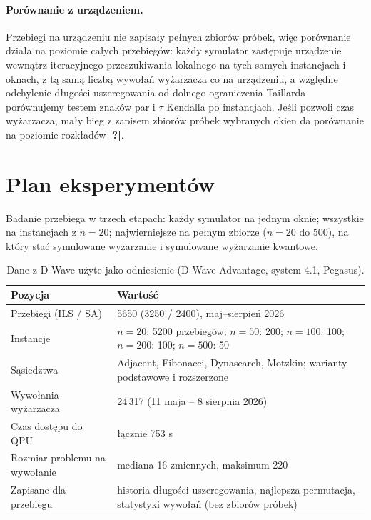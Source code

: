 \documentclass[11pt]{article}
\newcommand{\tofill}[1]{\textbf{[#1]}}
\begin{document}
\paragraph{Porównanie z urządzeniem.}
Przebiegi na urządzeniu nie zapisały pełnych zbiorów próbek, więc porównanie
działa na poziomie całych przebiegów: każdy symulator zastępuje urządzenie
wewnątrz iteracyjnego przeszukiwania lokalnego na tych samych instancjach
i oknach, z tą samą liczbą wywołań wyżarzacza co na urządzeniu, a względne
odchylenie długości uszeregowania od dolnego ograniczenia Taillarda
porównujemy testem znaków par i $\tau$ Kendalla po instancjach. Jeśli
pozwoli czas wyżarzacza, mały bieg z zapisem zbiorów próbek wybranych okien
da porównanie na poziomie rozkładów \tofill{?}.

\section{Plan eksperymentów}

Badanie przebiega w trzech etapach: każdy symulator na jednym oknie;
wszystkie na instancjach z $n = 20$; najwierniejsze na pełnym zbiorze
($n = 20$ do $500$), na który stać symulowane wyżarzanie i symulowane
wyżarzanie kwantowe.

\begin{table}[t]
\caption{Dane z D-Wave użyte jako odniesienie (D-Wave Advantage, system 4.1, Pegasus).}
\label{tab:hw}
\centering
\small
\begin{tabular}{ll}
\toprule
Pozycja & Wartość \\
\midrule
Przebiegi (ILS / SA) & 5650 (3250 / 2400), maj--sierpień 2026 \\
Instancje & $n = 20$: 5200 przebiegów; $n = 50$: 200; $n = 100$: 100; $n = 200$: 100; $n = 500$: 50 \\
Sąsiedztwa & Adjacent, Fibonacci, Dynasearch, Motzkin; warianty podstawowe i rozszerzone~\cite{wojewodzki2026windowed} \\
Wywołania wyżarzacza & 24\,317 (11 maja -- 8 sierpnia 2026) \\
Czas dostępu do QPU & łącznie 753 s \\
Rozmiar problemu na wywołanie & mediana 16 zmiennych, maksimum 220 \\
Zapisane dla przebiegu & historia długości uszeregowania, najlepsza permutacja, statystyki wywołań (bez zbiorów próbek) \\
\bottomrule
\end{tabular}
\end{table}
\end{document}

